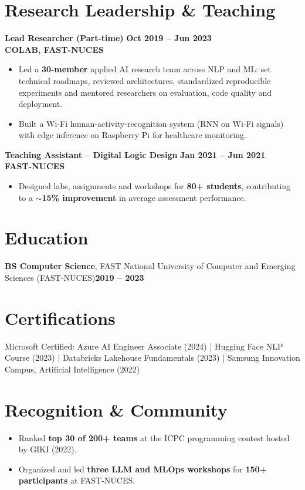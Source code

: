 \documentclass[a4paper,10pt]{article}
\newcommand{\role}[4]{%
  {\large\bfseries #1}\hfill{\bfseries\color{accent} #2}\\
  {\color{accent2}\bfseries #3}\hfill{\color{muted}\itshape #4}\par
}
\begin{document}
\section*{Research Leadership \& Teaching}
\role{Lead Researcher (Part-time)}{Oct 2019 -- Jun 2023}{COLAB, FAST-NUCES}{}
\begin{itemize}
  \item Led a \textbf{30-member} applied AI research team across NLP and ML: set technical roadmaps, reviewed architectures, standardized reproducible experiments and mentored researchers on evaluation, code quality and deployment.
  \item Built a Wi-Fi human-activity-recognition system (RNN on Wi-Fi signals) with edge inference on Raspberry Pi for healthcare monitoring.
\end{itemize}
\vspace{3pt}
\role{Teaching Assistant -- Digital Logic Design}{Jan 2021 -- Jun 2021}{FAST-NUCES}{}
\begin{itemize}
  \item Designed labs, assignments and workshops for \textbf{80+ students}, contributing to a \textbf{$\sim$15\% improvement} in average assessment performance.
\end{itemize}

\section*{Education}
\textbf{BS Computer Science}, FAST National University of Computer and Emerging Sciences (FAST-NUCES)\hfill{\bfseries\color{accent}2019 -- 2023}\par

\section*{Certifications}
Microsoft Certified: Azure AI Engineer Associate (2024) \;|\; Hugging Face NLP Course (2023) \;|\; Databricks Lakehouse Fundamentals (2023) \;|\; Samsung Innovation Campus, Artificial Intelligence (2022)\par

\section*{Recognition \& Community}
\begin{itemize}
  \item Ranked \textbf{top 30 of 200+ teams} at the ICPC programming contest hosted by GIKI (2022).
  \item Organized and led \textbf{three LLM and MLOps workshops} for \textbf{150+ participants} at FAST-NUCES.
\end{itemize}
\end{document}
